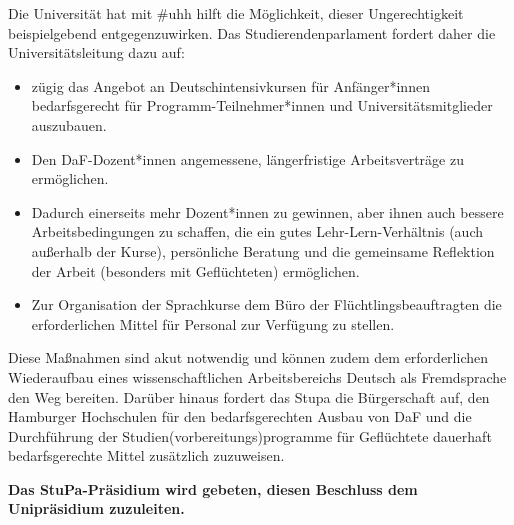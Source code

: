 \documentclass[ngerman,headheight=70pt]{scrartcl}
\begin{document}
    Die Universität hat mit \#uhh hilft die Möglichkeit, dieser Ungerechtigkeit
    beispielgebend entgegenzuwirken. Das Studierendenparlament fordert daher die
    Universitätsleitung dazu auf:

    \begin{itemize}
        \item zügig das Angebot an Deutschintensivkursen für Anfänger*innen
        bedarfsgerecht für Programm-Teilnehmer*innen und Universitätsmitglieder
        auszubauen.
        \item Den DaF-Dozent*innen angemessene, längerfristige Arbeitsverträge
        zu ermöglichen.
        \item Dadurch einerseits mehr Dozent*innen zu gewinnen, aber ihnen auch
        bessere Arbeitsbedingungen zu schaffen, die ein gutes Lehr-Lern-Verhältnis
        (auch außerhalb der Kurse), persönliche Beratung und die gemeinsame
        Reflektion der Arbeit (besonders mit Geflüchteten) ermöglichen.
        \item Zur Organisation der Sprachkurse dem Büro der Flüchtlingsbeauftragten
        die erforderlichen Mittel für Personal zur Verfügung zu stellen.
    \end{itemize}

    Diese Maßnahmen sind akut notwendig und können zudem dem erforderlichen
    Wiederaufbau eines wissenschaftlichen Arbeitsbereichs Deutsch als Fremdsprache
    den Weg bereiten.
    Darüber hinaus fordert das Stupa die Bürgerschaft auf, den Hamburger
    Hochschulen für den bedarfsgerechten Ausbau von DaF und die Durchführung der
    Studien(vorbereitungs)programme für Geflüchtete dauerhaft bedarfsgerechte Mittel
    zusätzlich zuzuweisen.

    \textbf{Das StuPa-Präsidium wird gebeten, diesen Beschluss dem Unipräsidium
    zuzuleiten.}
\end{document}
